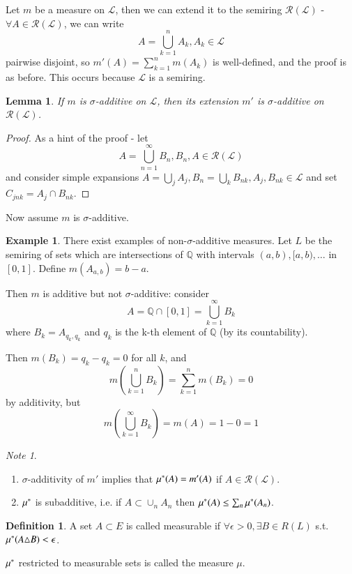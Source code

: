 \documentclass[11pt,a4paper]{report}
\newtheorem{lemma}[theorem]{Lemma}
\theoremstyle{plain}
\theoremstyle{definition}
\newtheorem*{defn}{Definition}
\newtheorem*{eg}{Example}
\theoremstyle{remark}
\newtheorem*{note}{Note}
\newcommand{\union}{\cup}
\newcommand{\intersection}{\cap}
\newcommand{\Union}{\bigcup}
\newcommand{\Q}{\mathbb{Q}}
\newcommand{\cL}{\mathcal{L}}
\newcommand{\cR}{\mathcal{R}}
\begin{document}
Let $m$ be a measure on $\cL$, then we can extend it to the semiring $\cR(\cL)$ - $\forall A \in \cR(\cL)$, we can write $$ A = \Union_{k=1}^n A_k, A_k \in \cL $$ pairwise disjoint, so $m'(A) = \sum_{k=1}^n m(A_k)$ is well-defined, and the proof is as before. This occurs because $\cL$ is a semiring.

\begin{lemma}
  If $m$ is $\sigma$-additive on $\cL$, then its extension $m'$ is $\sigma$-additive on $\cR(\cL)$.
\end{lemma}

\begin{proof}
    As a hint of the proof - let $$ A = \Union_{n=1}^\infty B_n, B_n, A \in \cR(\cL) $$ and consider simple expansions $A = \Union_j A_j, B_n = \Union_k B_{nk}, A_j, B_{nk} \in \cL$ and set $C_{jnk} = A_j \intersection B_{nk}$.
\end{proof}

Now assume $m$ is $\sigma$-additive.

\begin{eg}
  There exist examples of non-$\sigma$-additive measures. Let $L$ be the semiring of sets which are intersections of $\Q$ with intervals $(a, b), [a, b), \dots$ in $[0, 1]$.  Define $m(A_{a, b}) = b - a$.

    Then $m$ is additive but not $\sigma$-additive: consider 
    $$ A = \Q \intersection [0,1] = \Union_{k = 1}^\infty B_k $$
    where $B_k = A_{q_k, q_k}$ and $q_k$ is the k-th element of $\Q$ (by its countability).

    Then $m(B_k) = q_k - q_k = 0$ for all $k$, and
    $$ m(\Union_{k=1}^n B_k) = \sum_{k=1}^n m(B_k) = 0 $$
    by additivity, but
    $$ m(\Union_{k=1}^\infty B_k) = m(A) = 1 - 0 = 1 $$
\end{eg}

\begin{note}\;\
  \begin{enumerate}
    \item{ $\sigma$-additivity of $m'$ implies that $\mu^{*}(A) = m'(A)$ if $A \in \cR(\cL)$. }
    \item{ $\mu^{*}$ is subadditive, i.e. if $A \subset \union_n A_n$ then $\mu^{*}(A) \le \sum_n \mu^{*}(A_n)$. }
  \end{enumerate}
\end{note}

\begin{defn}
    A set $A \subset E$ is called measurable if $\forall \epsilon > 0, \exists B \in R(L)$ s.t. $\mu^{*}(A \triangle B) < \epsilon$. 

  $\mu^{*}$ restricted to measurable sets is called the measure $\mu$.
\end{defn}
\end{document}
